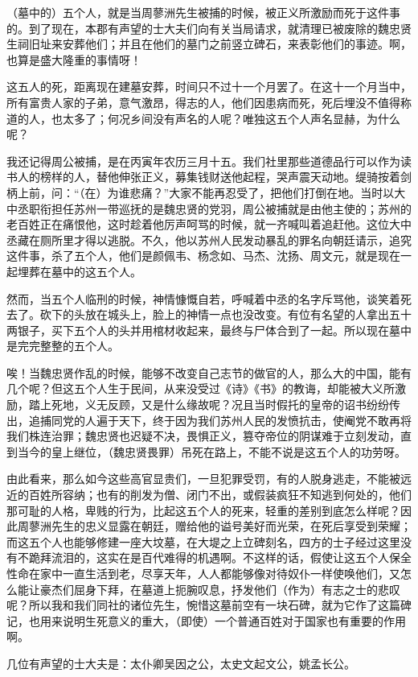 \documentclass[12pt,UTF-8,openany,a4]{ctexbook}
\begin{document}
\begin{large}
    \yiwen 
    （墓中的）五个人，就是当周蓼洲先生被捕的时候，被正义所激励而死于这件事的。到了现在，本郡有声望的士大夫们向有关当局请求，就清理已被废除的魏忠贤生祠旧址来安葬他们；并且在他们的墓门之前竖立碑石，来表彰他们的事迹。啊，也算是盛大隆重的事情呀！
    
    这五人的死，距离现在建墓安葬，时间只不过十一个月罢了。在这十一个月当中，所有富贵人家的子弟，意气激昂，得志的人，他们因患病而死，死后埋没不值得称道的人，也太多了；何况乡间没有声名的人呢？唯独这五个人声名显赫，为什么呢？
    
    我还记得周公被捕，是在丙寅年农历三月十五。我们社里那些道德品行可以作为读书人的榜样的人，替他伸张正义，募集钱财送他起程，哭声震天动地。缇骑按着剑柄上前，问：“（在）为谁悲痛？”大家不能再忍受了，把他们打倒在地。当时以大中丞职衔担任苏州一带巡抚的是魏忠贤的党羽，周公被捕就是由他主使的；苏州的老百姓正在痛恨他，这时趁着他厉声呵骂的时候，就一齐喊叫着追赶他。这位大中丞藏在厕所里才得以逃脱。不久，他以苏州人民发动暴乱的罪名向朝廷请示，追究这件事，杀了五个人，他们是颜佩韦、杨念如、马杰、沈扬、周文元，就是现在一起埋葬在墓中的这五个人。
    
    然而，当五个人临刑的时候，神情慷慨自若，呼喊着中丞的名字斥骂他，谈笑着死去了。砍下的头放在城头上，脸上的神情一点也没改变。有位有名望的人拿出五十两银子，买下五个人的头并用棺材收起来，最终与尸体合到了一起。所以现在墓中是完完整整的五个人。
    
    唉！当魏忠贤作乱的时候，能够不改变自己志节的做官的人，那么大的中国，能有几个呢？但这五个人生于民间，从来没受过《诗》《书》的教诲，却能被大义所激励，踏上死地，义无反顾，又是什么缘故呢？况且当时假托的皇帝的诏书纷纷传出，追捕同党的人遍于天下，终于因为我们苏州人民的发愤抗击，使阉党不敢再将我们株连治罪；魏忠贤也迟疑不决，畏惧正义，篡夺帝位的阴谋难于立刻发动，直到当今的皇上继位，（魏忠贤畏罪）吊死在路上，不能不说是这五个人的功劳呀。
    
    由此看来，那么如今这些高官显贵们，一旦犯罪受罚，有的人脱身逃走，不能被远近的百姓所容纳；也有的削发为僧、闭门不出，或假装疯狂不知逃到何处的，他们那可耻的人格，卑贱的行为，比起这五个人的死来，轻重的差别到底怎么样呢？因此周蓼洲先生的忠义显露在朝廷，赠给他的谥号美好而光荣，在死后享受到荣耀；而这五个人也能够修建一座大坟墓，在大堤之上立碑刻名，四方的士子经过这里没有不跪拜流泪的，这实在是百代难得的机遇啊。不这样的话，假使让这五个人保全性命在家中一直生活到老，尽享天年，人人都能够像对待奴仆一样使唤他们，又怎么能让豪杰们屈身下拜，在墓道上扼腕叹息，抒发他们（作为）有志之士的悲叹呢？所以我和我们同社的诸位先生，惋惜这墓前空有一块石碑，就为它作了这篇碑记，也用来说明生死意义的重大，（即使）一个普通百姓对于国家也有重要的作用啊。
    
    几位有声望的士大夫是：太仆卿吴因之公，太史文起文公，姚孟长公。
    
\end{large}
\end{document}
